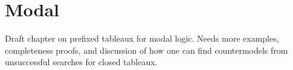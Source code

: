\documentclass[../../../include/open-logic-chapter]{subfiles}
\begin{document}
\chapter{Modal }

\begin{editorial}
  Draft chapter on prefixed tableaux for modal logic. Needs more
  examples, completeness proofs, and discussion of how one can find
  countermodels from unsuccessful searches for closed tableaux.
\end{editorial}


\OLEndChapterHook
\end{document}
